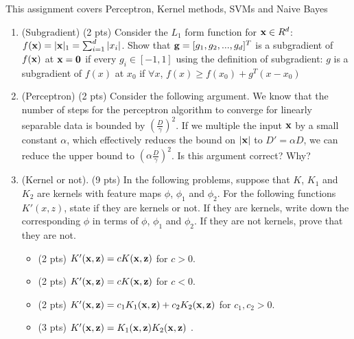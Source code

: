 \documentclass{article}
\def\z{{\bf z}}
\def\x{{\bf x}}
\begin{document}
This assignment covers Perceptron, Kernel methods, SVMs and Naive Bayes
\begin{enumerate}
\item (Subgradient) (2 pts) Consider the $L_1$ form function for 
$\x\in R^d$: $f(\x)=|\x|_1=\sum_{i=1}^d|x_i|$. Show that 
${\bf g}=[g_1, g_2, ...,g_d]^T$ is a subgradient of $f(\x)$ at $\x={\bf 0}$ if 
every $g_i \in [-1,1] $ using the definition of subgradient: $g$ is a subgradient of $f(x)$ at $x_0$ if $\forall x$, $f(x)\geq f(x_0)+g^T(x-x_0)$


\item (Perceptron) (2 pts) Consider the following argument. We know that the 
number of steps for the perceptron algorithm to converge for linearly separable 
data is bounded by $(\frac{D}{\gamma})^2$. If we multiple the input $\x$ by a 
small constant $\alpha$, which effectively reduces the bound on $|\x|$ to 
$D' =\alpha D$, we can reduce the upper bound to $(\alpha \frac{D}{\gamma})^2$. 
Is this argument correct? Why? 


\item (Kernel or not). (9 pts) In the following problems, suppose that $K$, 
$K_1$ and $K_2$ are kernels with feature maps $\phi$, $\phi_1$ and $\phi_2$. 
For the following functions $K'(x, z)$, state if they are kernels or not. If 
they are kernels, write down the corresponding $\phi$ in terms of $\phi$, 
$\phi_1$ and $\phi_2$. If they are not kernels, prove that they are not.

\begin{itemize}
\item (2 pts) $K'(\x, \z) = cK(\x, \z)$ for $c > 0$.\\
\item (2 pts) $K'(\x,\z) = cK(\x, \z)$ for $c < 0$.\\
\item (2 pts) $K'(\x,\z)= c_1K_1(\x, \z)+c_2K_2(\x,\z)$ for $c_1, c_2 >0$.\\
\item (3 pts) $K'(\x,\z)= K_1(\x, \z)K_2(\x,\z)$ .\\


\end{itemize}
\end{enumerate}
\end{document}
